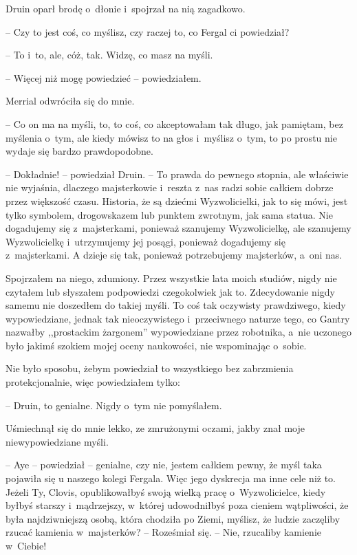 \documentclass[oneside,polish,11pt,sfheadings]{mwbk}
\begin{document}
Druin oparł brodę o~dłonie i~spojrzał na nią zagadkowo.

-- Czy to jest coś, co myślisz, czy raczej to, co Fergal ci powiedział?

-- To i~to, ale, cóż, tak. Widzę, co masz na myśli.

-- Więcej niż mogę powiedzieć -- powiedziałem.

Merrial odwróciła się do mnie. 

-- Co on ma na myśli, to, to coś, co
akceptowałam tak długo, jak pamiętam, bez myślenia o~tym, ale kiedy
mówisz to na głos i~myślisz o~tym, to po prostu nie wydaje się bardzo
prawdopodobne.

-- Dokładnie! -- powiedział Druin. -- To prawda do pewnego stopnia, ale
właściwie nie wyjaśnia, dlaczego majsterkowie i~reszta z~nas radzi sobie
całkiem dobrze przez większość czasu. Historia, że są dziećmi
Wyzwolicielki, jak to się mówi, jest tylko symbolem, drogowskazem lub
punktem zwrotnym, jak sama statua. Nie dogadujemy się z~majsterkami,
ponieważ szanujemy Wyzwolicielkę, ale szanujemy Wyzwolicielkę i~utrzymujemy jej posągi, ponieważ dogadujemy się z~majsterkami. A dzieje
się tak, ponieważ potrzebujemy majsterków, a~oni nas.

Spojrzałem na niego, zdumiony. Przez wszystkie lata moich studiów, nigdy
nie czytałem lub słyszałem podpowiedzi czegokolwiek jak to. Zdecydowanie
nigdy samemu nie doszedłem do takiej myśli. To coś tak oczywisty
prawdziwego, kiedy wypowiedziane, jednak tak nieoczywistego i~przeciwnego naturze tego, co Gantry nazwałby ,,prostackim żargonem''
wypowiedziane przez robotnika, a~nie uczonego było jakimś szokiem mojej
oceny naukowości, nie wspominając o~sobie.

Nie było sposobu, żebym powiedział to wszystkiego bez zabrzmienia
protekcjonalnie, więc powiedziałem tylko: 

-- Druin, to genialne. Nigdy o~tym nie pomyślałem.

Uśmiechnął się do mnie lekko, ze zmrużonymi oczami, jakby znał moje
niewypowiedziane myśli. 

-- Aye -- powiedział -- genialne, czy nie, jestem
całkiem pewny, że myśl taka pojawiła się u naszego kolegi Fergala. Więc
jego dyskrecja ma inne cele niż to. Jeżeli Ty, Clovis, opublikowałbyś
swoją wielką pracę o~Wyzwolicielce, kiedy byłbyś starszy i~mądrzejszy, w~której udowodniłbyś poza cieniem wątpliwości, że była najdziwniejszą
osobą, która chodziła po Ziemi, myślisz, że ludzie zaczęliby rzucać
kamienia w~majsterków? -- Roześmiał się. -- Nie, rzucaliby kamienie w~Ciebie!
\end{document}
